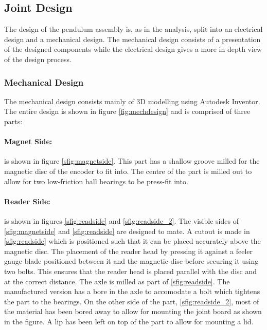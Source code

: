 \subsection{Joint Design} %
\label{sub:joint_design}
The design of the pendulum assembly is, as in the analysis, split into an electrical design and a mechanical design.
The mechanical design consists of a presentation of the designed components while the electrical design gives a more in depth view of the design process.

\subsubsection{Mechanical Design} %
\label{ssub:mechanical_design}
The mechanical design consists mainly of 3D modelling using Autodesk Inventor.
The entire design is shown in figure \ref{fig:mechdesign} and is comprised of three parts:
\paragraph{Magnet Side:} %
\label{par:magnet_side}
is shown in figure \ref{sfig:magnetside}. 
This part has a shallow groove milled for the magnetic disc of the encoder to fit into.
The centre of the part is milled out to allow for two low-friction ball bearings to be press-fit into.
\paragraph{Reader Side:} %
\label{par:reader_side}
is shown in figures \ref{sfig:readside} and \ref{sfig:readside_2}.
The visible sides of \ref{sfig:magnetside} and \ref{sfig:readside} are designed to mate.
A cutout is made in \ref{sfig:readside} which is positioned such that it can be placed accurately above the magnetic disc.
The placement of the reader head by pressing it against a feeler gauge blade positioned between it and the magnetic disc before securing it using two bolts.
This ensures that the reader head is placed parallel with the disc and at the correct distance.
The axle is milled as part of \ref{sfig:readside}.
The manufactured version has a bore in the axle to accomodate a bolt which tightens the part to the bearings.
On the other side of the part, \ref{sfig:readside_2}, most of the material has been bored away to allow for mounting the joint board as shown in the figure.
A lip has been left on top of the part to allow for mounting a lid.

